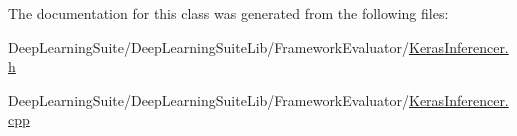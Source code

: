The documentation for this class was generated from the following files\+:\begin{DoxyCompactItemize}
\item 
Deep\+Learning\+Suite/\+Deep\+Learning\+Suite\+Lib/\+Framework\+Evaluator/\hyperlink{_keras_inferencer_8h}{Keras\+Inferencer.\+h}\item 
Deep\+Learning\+Suite/\+Deep\+Learning\+Suite\+Lib/\+Framework\+Evaluator/\hyperlink{_keras_inferencer_8cpp}{Keras\+Inferencer.\+cpp}\end{DoxyCompactItemize}

